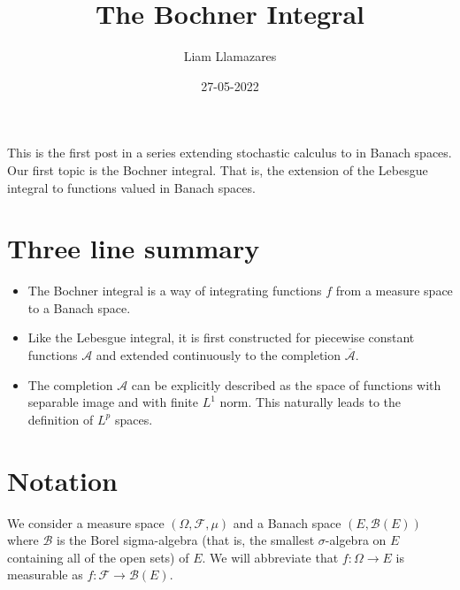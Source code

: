 \documentclass[12pt]{article}
\newcommand{\Aa}{\mathcal{A}}\newcommand{\Bb}{\mathcal{B}}\newcommand{\Cc}{\mathcal{C}}\newcommand{\Ee}{\mathcal{E}}\newcommand{\Ff}{\mathcal{F}}\newcommand{\Gg}{\mathcal{G}}\newcommand{\Hh}{\mathcal{H}}\newcommand{\Kk}{\mathcal{K}}\newcommand{\Ll}{\mathcal{L}}\newcommand{\Mm}{\mathcal{M}}\newcommand{\Nn}{\mathcal{N}}\newcommand{\Pp}{\mathcal{P}}\newcommand{\Qq}{\mathcal{Q}}\newcommand{\Rr}{{\mathcal R}}\newcommand{\Tt}{{\mathcal T}}\newcommand{\Zz}{{\mathcal Z}}\newcommand{\Uu}{{\mathcal U}}
\begin{document}
\title{The Bochner Integral}
\author{Liam Llamazares}
\date{27-05-2022}
\maketitle
This is the first post in a series extending stochastic calculus to in Banach spaces. Our first topic is the Bochner integral. That is, the extension of the Lebesgue integral to functions valued in Banach spaces.
\section{Three line summary}
\begin{itemize}
	\item The Bochner integral is a way of integrating functions $f$ from a measure space to a Banach space.
	\item Like the Lebesgue integral, it is first constructed for piecewise constant functions $\Aa$ and extended continuously to the completion $\overline{\Aa}$.
	\item The completion $\Aa$ can be explicitly described as the space of functions with separable image and with finite $L^1$ norm. This naturally leads to the definition of  $L^p$ spaces.
\end{itemize}
\section{Notation}
We consider a measure space $(\Omega,\Ff,\mu )$ and a Banach space $(E,\Bb(E))$ where $\Bb$ is the Borel  sigma-algebra (that is, the smallest $\sigma $-algebra on $E$ containing all of the open sets) of $E$. We will abbreviate that $f:\Omega\to E$ is measurable as $f:\Ff\to \Bb(E)$.
\end{document}
